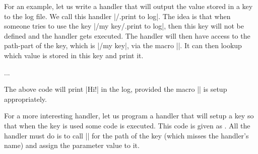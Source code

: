 For an example, let us write a handler that will output the value
stored in a key to the log file. We call this handler
|/.print to log|. The idea is that when someone tries to use the key
|/my key/.print to log|, then this key will not be defined and the
handler gets executed. The handler will then have access to the
path-part of the key, which is |/my key|, via the macro
|\pgfkeyscurrentpath|. It can then lookup which value is stored in
this key and print it.

\begin{codeexample}
{%
  \pgfkeysgetvalue{\pgfkeyscurrentpath}{\temp}
  \writetolog{\temp}
}
...
\end{codeexample}
The above code will print |Hi!| in the log, provided the macro
|\writetolog| is setup appropriately.

For a more interesting handler, let us program a handler that will
setup a key so that when the key is used some code is executed. This
code is given as . All the handler must do is to call
|\pgfkeysdef| for the path of the key (which misses the handler's
name) and assign the parameter value to it.
\begin{codeexample}[]
\end{codeexample}

